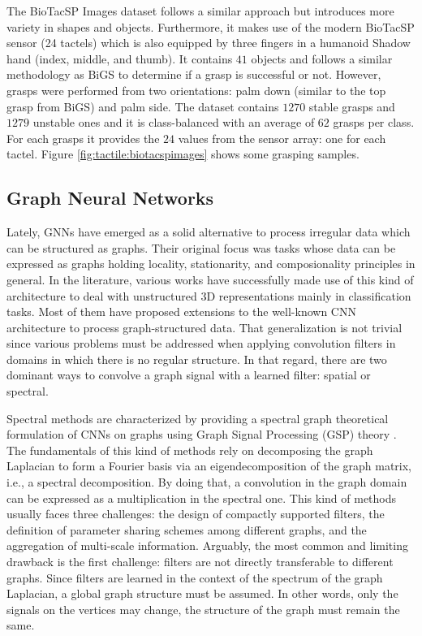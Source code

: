 The BioTacSP Images dataset \cite{Zapata2018} follows a similar approach but introduces more variety in shapes and objects. Furthermore, it makes use of the modern BioTacSP sensor (24 tactels) which is also equipped by three fingers in a humanoid Shadow hand (index, middle, and thumb). It contains $41$ objects and follows a similar methodology as \ac{BiGS} to determine if a grasp is successful or not. However, grasps were performed from two orientations: palm down (similar to the top grasp from \ac{BiGS}) and palm side. The dataset contains $1270$ stable grasps and $1279$ unstable ones and it is class-balanced with an average of $62$ grasps per class. For each grasps it provides the $24$ values from the sensor array: one for each tactel. Figure \ref{fig:tactile:biotacspimages} shows some grasping samples.

\subsection{Graph Neural Networks}
\label{cha:tactile:sec:relatedworks:subsec:gcns}

Lately, \acp{GNN} have emerged as a solid alternative to process irregular data which can be structured as graphs. Their original focus was tasks whose data can be expressed as graphs holding locality, stationarity, and composionality principles in general. In the literature, various works have successfully made use of this kind of architecture to deal with unstructured \acs{3D} representations mainly in classification tasks. Most of them  have proposed extensions to the well-known \ac{CNN} architecture to process graph-structured data. That generalization is not trivial since various problems must be addressed when applying convolution filters in domains in which there is no regular structure. In that regard, there are two dominant ways to convolve a graph signal with a learned filter: spatial or spectral.

Spectral methods are characterized by providing a spectral graph theoretical formulation of CNNs on graphs using Graph Signal Processing (GSP) theory \cite{Shuman2013}. The fundamentals of this kind of methods rely on decomposing the graph Laplacian to form a Fourier basis via an eigendecomposition of the graph matrix, i.e., a spectral decomposition. By doing that, a convolution in the graph domain can be expressed as a multiplication in the spectral one. This kind of methods usually faces three challenges: the design of compactly supported filters, the definition of parameter sharing schemes among different graphs, and the aggregation of multi-scale information. Arguably, the most common and limiting drawback is the first challenge: filters are not directly transferable to different graphs. Since filters are learned in the context of the spectrum of the graph Laplacian, a global graph structure must be assumed. In other words, only the signals on the vertices may change, the structure of the graph must remain the same.

